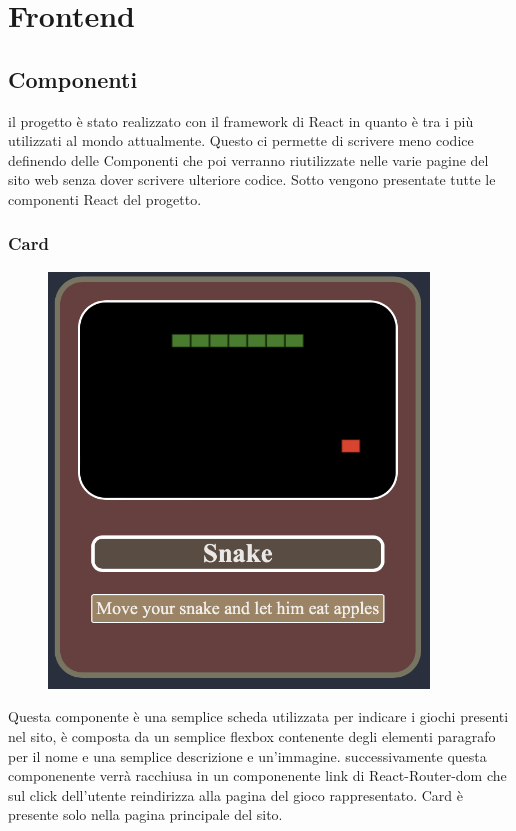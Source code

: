 \documentclass{article}
\begin{document}
\section{Frontend}

\subsection{Componenti}
il progetto è stato realizzato con il framework di React in quanto è tra i più utilizzati
al mondo attualmente. Questo ci permette di scrivere meno codice definendo delle Componenti
che poi verranno riutilizzate nelle varie pagine del sito web senza dover scrivere ulteriore codice.
Sotto vengono presentate tutte le componenti React del progetto.

\subsubsection{Card}
\begin{figure}[H]
    \centering
    \includegraphics[width=0.9\textwidth]{images/Card.png}
\end{figure}
Questa componente è una semplice scheda utilizzata per indicare i giochi presenti nel sito, è composta da un semplice flexbox
contenente degli elementi paragrafo per il nome e una semplice descrizione e un'immagine.
successivamente questa componenente verrà racchiusa in un componenente link di React-Router-dom che sul click dell'utente 
reindirizza alla pagina del gioco rappresentato. Card è presente solo nella pagina principale del sito.
\end{document}
